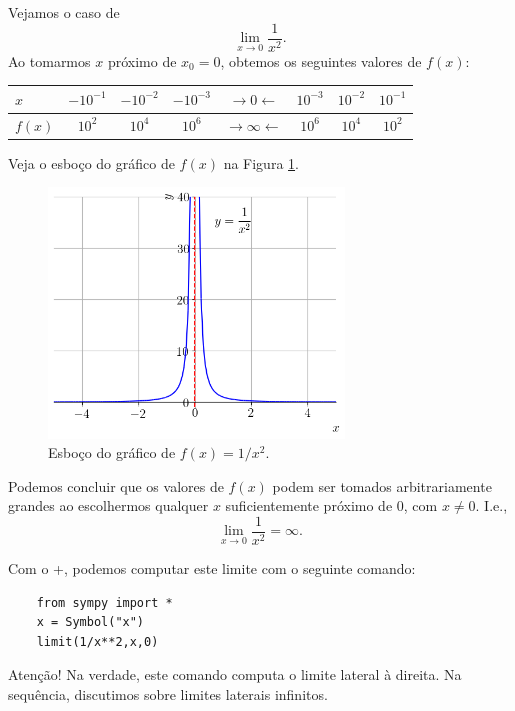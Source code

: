 \begin{ex}
  Vejamos o caso de
  \begin{equation}
    \lim_{x\to 0} \frac{1}{x^2}.
  \end{equation}
  Ao tomarmos $x$ próximo de $x_0=0$, obtemos os seguintes valores de $f(x)$:
  \begin{center}
    \begin{tabular}[H]{l|ccc|c|ccc}
      $x$ & $-10^{-1}$ & $-10^{-2}$ & $-10^{-3}$ & $\rightarrow 0 \leftarrow$ & $10^{-3}$ & $10^{-2}$ & $10^{-1}$ \\\hline
      $f(x)$ & $10^{2}$ & $10^{4}$ & $10^{6}$ & $\rightarrow \infty \leftarrow$ & $10^{6}$ & $10^{4}$ & $10^{2}$
    \end{tabular}
  \end{center}
  Veja o esboço do gráfico de $f(x)$ na Figura \ref{fig:ex_liminf_1x2}.

\begin{figure}[H]
  \centering
  \includegraphics[width=0.7\textwidth]{./cap_lim/dados/fig_ex_liminf_1x2/fig}
  \caption{Esboço do gráfico de $f(x)=1/x^2$.}
  \label{fig:ex_liminf_1x2}
\end{figure}  

  Podemos concluir que os valores de $f(x)$ podem ser tomados arbitrariamente grandes ao escolhermos qualquer $x$ suficientemente próximo de $0$, com $x\neq 0$. I.e.,
  \begin{equation}
    \lim_{x\to 0}\frac{1}{x^2} = \infty.
  \end{equation}

  \ifispython
  Com o {\python}+{\sympy}, podemos computar este limite com o seguinte comando:
  \begin{lstlisting}
    from sympy import *
    x = Symbol("x")
    limit(1/x**2,x,0)
  \end{lstlisting}
  Atenção! Na verdade, este comando computa o limite lateral à direita. Na sequência, discutimos sobre limites laterais infinitos.
  \fi
\end{ex}

